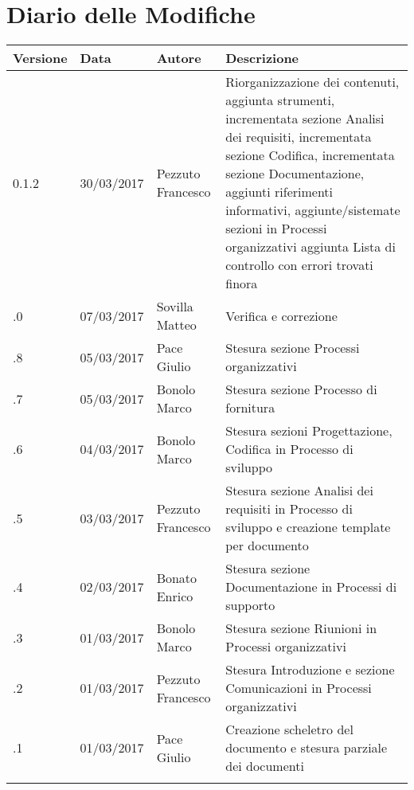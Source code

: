 \section*{Diario delle Modifiche}
\begin{longtabu} to \textwidth {
	X[4,l,p]
	X[4,l,p]
	X[4,l,p]
	X[8,l,p]}
	\toprule
		 Versione & Data & Autore & Descrizione \\
		\midrule
		\endhead
		
		0.1.2 & 30/03/2017 & Pezzuto Francesco & Riorganizzazione dei contenuti, aggiunta strumenti, incrementata sezione Analisi dei requisiti, incrementata sezione Codifica, incrementata sezione Documentazione, aggiunti riferimenti informativi, aggiunte/sistemate sezioni in Processi organizzativi aggiunta Lista di controllo con errori trovati finora\\
		\addlinespace[0.2em]
		\midrule
		.0 & 07/03/2017 & Sovilla Matteo & Verifica e correzione\\
		\addlinespace[0.2em]
		\midrule
		.8 & 05/03/2017 & Pace Giulio & Stesura sezione Processi organizzativi\\
		\addlinespace[0.2em]
		\midrule
		.7 & 05/03/2017 & Bonolo Marco & Stesura sezione Processo di fornitura\\
		\addlinespace[0.2em]
		\midrule
		.6 & 04/03/2017 & Bonolo Marco & Stesura sezioni Progettazione, Codifica in Processo di sviluppo\\
		\addlinespace[0.2em]
		\midrule
		.5 & 03/03/2017 & Pezzuto Francesco & Stesura sezione Analisi dei requisiti in Processo di sviluppo e creazione template per documento\\
		\addlinespace[0.2em]
		\midrule
		.4 & 02/03/2017 & Bonato Enrico & Stesura sezione Documentazione in Processi di supporto\\
		\addlinespace[0.2em]
		\midrule
		.3 & 01/03/2017 & Bonolo Marco & Stesura sezione Riunioni in Processi organizzativi\\
		\addlinespace[0.2em]
		\midrule
		.2 & 01/03/2017 & Pezzuto Francesco & Stesura Introduzione e sezione Comunicazioni in Processi organizzativi\\
		\addlinespace[0.2em]
		\midrule
		.1 & 01/03/2017 & Pace Giulio & Creazione scheletro del documento e stesura parziale dei documenti\\
		\addlinespace[0.4em]
		
	\bottomrule
\end{longtabu}